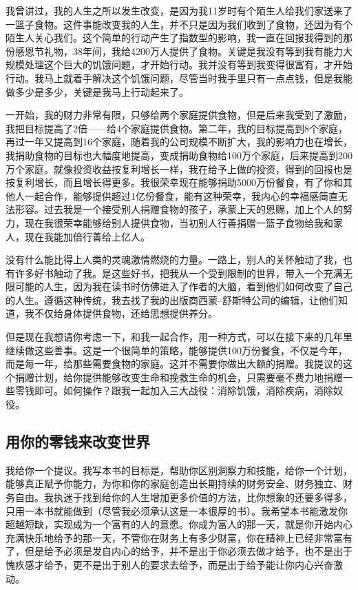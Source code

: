 我曾讲过，我的人生之所以发生改变，是因为我11岁时有个陌生人给我们家送来了一篮子食物。这件事能改变我的人生，并不只是因为我们收到了食物，还因为有个陌生人关心我们。这个简单的行动产生了指数型的影响，我一直在回报我得到的那份感恩节礼物，38年间，我给4200万人提供了食物。关键是我没有等到我有能力大规模处理这个巨大的饥饿问题，才开始行动。我并没有等到我变得很富有，才开始行动。我马上就着手解决这个饥饿问题，尽管当时我手里只有一点点钱，但是我能做多少是多少，关键是我马上行动起来了。

一开始，我的财力非常有限，只够给两个家庭提供食物，但是后来我受到了激励，我把目标提高了2倍——给4个家庭提供食物。第二年，我的目标提高到8个家庭，再过一年又提高到16个家庭，随着我的公司规模不断扩大，我的影响力也在增长，我捐助食物的目标也大幅度地提高，变成捐助食物给100万个家庭，后来提高到200万个家庭。就像投资收益按复利增长一样，我在给予上做的投资，得到的回报也是按复利增长，而且增长得更多。我很荣幸现在能够捐助5000万份餐食，有了你和其他人一起合作，能够提供超过1亿份餐食，能有这种荣幸，我内心的幸福感简直无法形容。过去我是一个接受别人捐赠食物的孩子，承蒙上天的恩赐，加上个人的努力，现在我很荣幸能够给别人提供食物，当初别人行善捐赠一篮子食物给我和家人，现在我能加倍行善给上亿人。

没有什么能比得上人类的灵魂激情燃烧的力量。一路上，别人的关怀触动了我，也有许多好书触动了我。是这些好书，把我从一个受到限制的世界，带入一个充满无限可能的人生，因为我在读书时仿佛进入了作者的大脑，看到他们如何改变了自己的人生。遵循这种传统，我去找了我的出版商西蒙–舒斯特公司的编辑，让他们知道，我不仅给身体提供食物，还给思想提供养分。

但是现在我想请你考虑一下，和我一起合作，用一种方式，可以在接下来的几年里继续做这些善事。这是一个很简单的策略，能够提供100万份餐食，不仅是今年，而是每一年，给那些需要食物的家庭。这并不需要你做出大额的捐赠。我提议的这个捐赠计划，给你提供能够改变生命和挽救生命的机会，只需要毫不费力地捐赠一些零钱即可。如何操作？跟我一起加入三大战役：消除饥饿，消除疾病，消除奴役。

\subsection{用你的零钱来改变世界}

我给你一个提议。我写本书的目标是，帮助你区别洞察力和技能，给你一个计划，能够真正赋予你能力，为你和你的家庭创造出长期持续的财务安全、财务独立、财务自由。我执迷于找到给你的人生增加更多价值的方法，比你想象的还要多得多，只用一本书就能做到（尽管我必须承认这是一本很厚的书）。我希望本书能激发你超越短缺，实现成为一个富有的人的意愿。你成为富人的那一天，就是你开始内心充满快乐地给予的那一天，不管你在财务上有多少财富，你在精神上已经非常富有了，但是给予必须是发自内心的给予，并不是出于你必须去做才给予，也不是出于愧疚感才给予，更不是出于别人的要求去给予，而是出于给予能让你内心兴奋激动。

